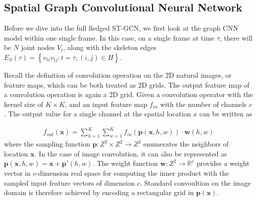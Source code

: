 \documentclass{article}
\begin{document}
\subsection{Spatial Graph Convolutional Neural Network}

Before we dive into the full fledged ST-GCN, {\color{red}we first look at the graph CNN model within one single frame.} In this case, on a single frame at time $\tau$, there will be $N$ joint nodes $V_t$, along with the skeleton edges $E_S(\tau)=\left\{ v_{ti}v_{tj}: t= \tau, (i,j)\in H\right\}$. 

Recall the definition of convolution operation on the 2D natural images, or feature maps, which can be both treated as 2D grids. The output feature map of a convolution operation is again a 2D grid. Given a convolution operator with the kernel size of $K\times K$, and an input feature map $f_{in}$ with the number of channels $c$. The output value for a single channel at the spatial location $x$ can be written as

\begin{align}\label{eq:convolution}
    f_{out}(\mathbf{x}) = \sum_{h=1}^K \sum_{w =1}^K f_{in}({\mathbf p}(\mathbf{x},h,w))\cdot \mathbf{w}(h,w)
\end{align}
where the sampling function $\mathbf{p}:Z^2 \times Z^2 \rightarrow Z^2$ enumerates the neighbors of location $\mathbf x$. In the case of image convolution, it can also be represented as $\mathbf{p}(\mathbf{x},h,w)= \mathbf{x}+ \mathbf{p}'(h,w)$. The weight function $\mathbf{w}:Z^2 \rightarrow \mathbb{R}^c$ provides a weight vector in $c$-dimension real space for computing the inner product with the sampled input feature vectors of dimension $c$. Standard convoultion on the image domain is therefore achieved by encoding a rectangular grid in $\mathbf{p}(\mathbf{x})$.
\end{document}
